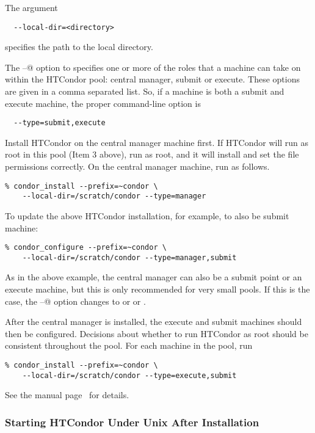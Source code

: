 The argument
\begin{verbatim}
  --local-dir=<directory>
\end{verbatim}
specifies the path to the local directory.

The \verb@--@ option to 
specifies one or more of the roles that a machine can take on
within the HTCondor pool: central manager, submit or execute.
These options are given in a comma separated list.
So, if a machine is both a submit and execute
machine, 
the proper command-line option is
\begin{verbatim}
  --type=submit,execute
\end{verbatim}

Install HTCondor on the central manager machine first.  If HTCondor
will run as root in this pool (Item 3 above), run  
as root, and it will install and set the file permissions correctly.  
On the central manager machine, run  as follows.
\begin{verbatim}
% condor_install --prefix=~condor \
	--local-dir=/scratch/condor --type=manager
\end{verbatim}

To update the above HTCondor installation, for example, to also be
submit machine:
\begin{verbatim}
% condor_configure --prefix=~condor \
	--local-dir=/scratch/condor --type=manager,submit
\end{verbatim}

As in the above example, the central manager can also be a submit
point or an execute machine, but this is only recommended for very
small pools.  If this is the case, the 
\verb@--@
option changes to
 or   or 
.

After the central manager is installed, the execute and submit machines
should then be configured.  Decisions about whether to run HTCondor as root
should be consistent throughout the pool. For each machine in the pool,
run

\begin{verbatim}
% condor_install --prefix=~condor \
	--local-dir=/scratch/condor --type=execute,submit
\end{verbatim}

See the  manual 
page~\pageref{man-condor-configure}
for details.


\subsubsection{\label{installed-now-what}
Starting HTCondor Under Unix After Installation}

